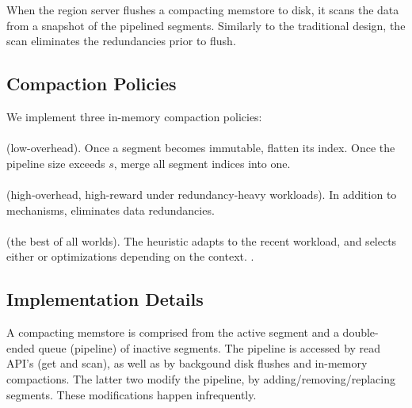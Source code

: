When the region server flushes a compacting memstore to disk, it scans the data from a snapshot 
of the pipelined segments. Similarly to the traditional design, the scan eliminates the redundancies 
prior to flush. 
 

\subsection{Compaction Policies}
\label{sec:policies}

We implement three in-memory compaction policies: 
\paragraph{\basic} (low-overhead). Once a segment becomes immutable, flatten its index. Once the pipeline size exceeds $s$, 
merge all segment indices into one.  
\paragraph{\eager} (high-overhead, high-reward under redundancy-heavy workloads). 
In addition to \basic\/ mechanisms, eliminates data redundancies.
\paragraph{\adp} (the best of all worlds). The heuristic adapts to the recent workload, and selects either \basic\/ 
or \eager\/ optimizations depending on the context. . 

\subsection{Implementation Details}

A compacting memstore is comprised from the active segment and a double-ended queue (pipeline) of inactive segments. 
The pipeline is accessed by read API's (get and scan), as well as by backgound disk flushes and in-memory compactions. 
The latter two modify the pipeline, by adding/removing/replacing segments. These modifications happen infrequently. 

